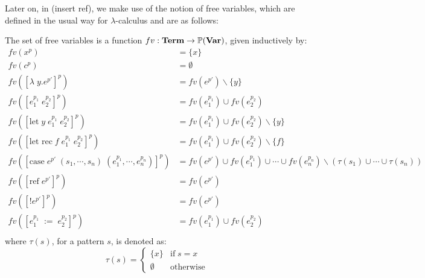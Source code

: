 \documentclass[../../master.tex]{subfiles}
\begin{document}

Later on, in (insert ref), we make use of the notion of free variables, which are defined in the usual way for $\lambda$-calculus and are as follows:
\begin{definition}\label{def:fv}
	The set of free variables is a function $fv:\textbf{Term}\rightarrow\mathbb{P}(\textbf{Var})$, given inductively by:
	\begin{align*}
		fv(x^p)&=\{x\}\\
		fv(c^p)&=\emptyset\\
		fv([\lambda\;y.e^{p'}]^p)&=fv(e^{p'})\backslash\{y\}\\
		fv([e_1^{p_1}\;e_2^{p_2}]^p)&=fv(e_1^{p_1})\cup fv(e_2^{p_2})\\
		fv([\mbox{let}\;y\;e_1^{p_1}\;e_2^{p_2}]^p)&=fv(e_1^{p_1})\cup fv(e_2^{p_2})\backslash\{y\}\\
		fv([\mbox{let rec}\;f\;e_1^{p_1}\;e_2^{p_2}]^p)&=fv(e_1^{p_1})\cup fv(e_2^{p_2})\backslash\{f\}\\
		fv([\mbox{case}\;e^{p'}\;(s_1,\cdots,s_n)\;(e_1^{p_1},\cdots,e_n^{p_n})]^p)&=fv(e^{p'})\cup fv(e_1^{p_1})\cup\cdots\cup fv(e_n^{p_n})\backslash(\tau(s_1)\cup\cdots\cup\tau(s_n))\\
		fv([\mbox{ref}\;e^{p'}]^p)&=fv(e^{p'})\\
		fv([!e^{p'}]^p)&=fv(e^{p'})\\
		fv([e_1^{p_1}\;:=\;e_2^{p_2}]^p)&=fv(e_1^{p_1})\cup fv(e_2^{p_2})\\
	\end{align*}
	where $\tau(s)$, for a pattern $s$, is denoted as:
	$$
	\tau(s)=
		\left\{\begin{matrix}
			\{x\} & \mbox{if}\;s=x\\ 
			\emptyset & \mbox{otherwise}
		\end{matrix}\right.
	$$
\end{definition}
\end{document}
